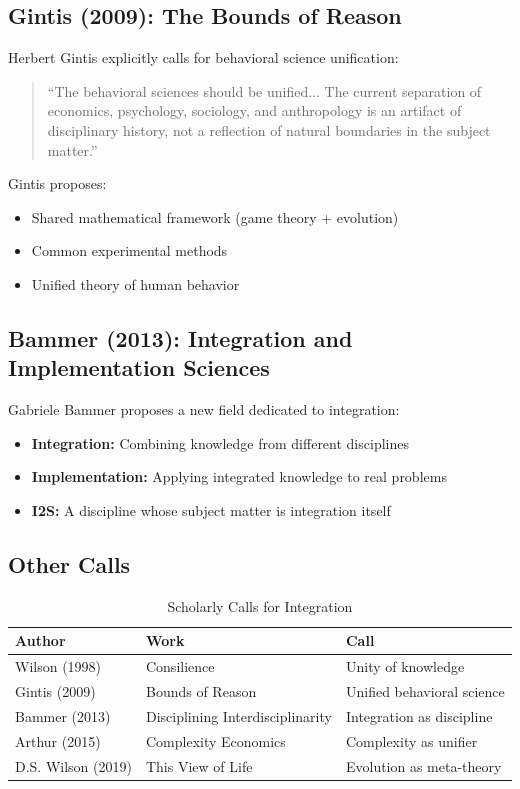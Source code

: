 \subsection{Gintis (2009): The Bounds of Reason}

Herbert Gintis explicitly calls for behavioral science unification:
\begin{quote}
``The behavioral sciences should be unified... The current separation of economics, psychology, sociology, and anthropology is an artifact of disciplinary history, not a reflection of natural boundaries in the subject matter.''
\end{quote}

Gintis proposes:
\begin{itemize}
\item Shared mathematical framework (game theory + evolution)
\item Common experimental methods
\item Unified theory of human behavior
\end{itemize}

\subsection{Bammer (2013): Integration and Implementation Sciences}

Gabriele Bammer proposes a new field dedicated to integration:
\begin{itemize}
\item \textbf{Integration:} Combining knowledge from different disciplines
\item \textbf{Implementation:} Applying integrated knowledge to real problems
\item \textbf{I2S:} A discipline whose subject matter is integration itself
\end{itemize}

\subsection{Other Calls}

\begin{table}[htbp]
\centering
\caption{Scholarly Calls for Integration}
\label{tab:calls}
\renewcommand{\arraystretch}{1.3}
\begin{tabular}{@{}lll@{}}
\toprule
\textbf{Author} & \textbf{Work} & \textbf{Call} \\
\midrule
Wilson (1998) & Consilience & Unity of knowledge \\
Gintis (2009) & Bounds of Reason & Unified behavioral science \\
Bammer (2013) & Disciplining Interdisciplinarity & Integration as discipline \\
Arthur (2015) & Complexity Economics & Complexity as unifier \\
D.S. Wilson (2019) & This View of Life & Evolution as meta-theory \\
\bottomrule
\end{tabular}
\end{table}


